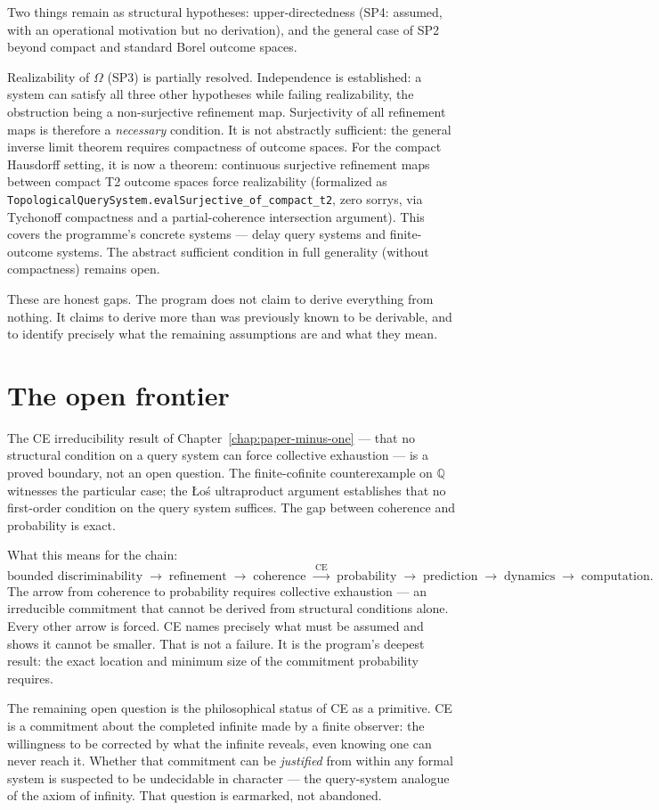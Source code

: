 Two things remain as structural hypotheses: upper-directedness
(SP4: assumed, with an operational motivation but no derivation),
and the general case of SP2 beyond compact and standard Borel
outcome spaces.

Realizability of $\Omega$ (SP3) is partially resolved.
Independence is established: a system can satisfy all three other
hypotheses while failing realizability, the obstruction being
a non-surjective refinement map.
Surjectivity of all refinement maps is therefore a \emph{necessary}
condition.  It is not abstractly sufficient: the general inverse
limit theorem requires compactness of outcome spaces.
For the compact Hausdorff setting, it is now a theorem: continuous
surjective refinement maps between compact T2 outcome spaces force
realizability (formalized as
\texttt{TopologicalQuerySystem.evalSurjective\_of\_compact\_t2},
zero sorrys, via Tychonoff compactness and a partial-coherence
intersection argument).  This covers the programme's concrete
systems --- delay query systems and finite-outcome systems.
The abstract sufficient condition in full generality (without
compactness) remains open.

These are honest gaps.  The program does not claim to derive
everything from nothing.  It claims to derive more than was
previously known to be derivable, and to identify precisely what
the remaining assumptions are and what they mean.

\section*{The open frontier}

The CE irreducibility result of
Chapter~\ref{chap:paper-minus-one} --- that no structural condition
on a query system can force collective exhaustion --- is a proved
boundary, not an open question.  The finite-cofinite counterexample
on $\mathbb{Q}$ witnesses the particular case; the Łoś ultraproduct
argument establishes that no first-order condition on the query
system suffices.  The gap between coherence and probability is exact.

What this means for the chain:
\[
\text{bounded discriminability}
\;\to\;
\text{refinement}
\;\to\;
\text{coherence}
\;\xrightarrow{\;\text{CE}\;}\;
\text{probability}
\;\to\;
\text{prediction}
\;\to\;
\text{dynamics}
\;\to\;
\text{computation.}
\]
The arrow from coherence to probability requires collective
exhaustion --- an irreducible commitment that cannot be derived
from structural conditions alone.  Every other arrow is forced.
CE names precisely what must be assumed and shows it cannot be
smaller.  That is not a failure.  It is the program's deepest
result: the exact location and minimum size of the commitment
probability requires.

The remaining open question is the philosophical status of CE
as a primitive.  CE is a commitment about the completed infinite
made by a finite observer: the willingness to be corrected by
what the infinite reveals, even knowing one can never reach it.
Whether that commitment can be \emph{justified} from within any
formal system is suspected to be undecidable in character ---
the query-system analogue of the axiom of infinity.  That
question is earmarked, not abandoned.
